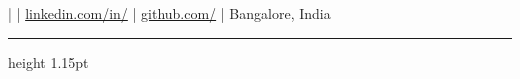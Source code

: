 \begin{center}
{\huge \textbf{\name}} \\[0.16em]
{\color{highlight} \large \role} \\[0.22em]
\small
\phone \quad | \quad
\href{mailto:\email}{\email} \quad | \quad
\href{https://www.linkedin.com/in/\LinkedIn}{linkedin.com/in/\LinkedIn} \quad | \quad
\href{https://github.com/\github}{github.com/\github} \quad | \quad
Bangalore, India
\end{center}
\vspace{0.28em}
{\color{highlight}\hrule height 1.15pt}
\vspace{0.48em}
